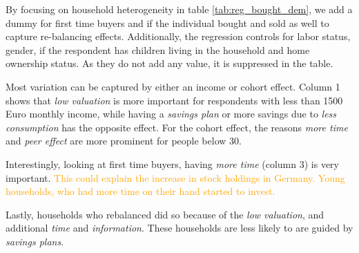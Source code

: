 \documentclass[ProjectABM]{subfiles}
\begin{document}
By focusing on household heterogeneity in table \ref{tab:reg_bought_dem}, we add a dummy for first time buyers and if the individual bought and sold as well to capture re-balancing effects. Additionally, the regression controls for labor status, gender, if the respondent has children living in the household and home ownership status. As they do not add any value, it is suppressed in the table.

Most variation can be captured by either an income or cohort effect. Column 1 shows that \textit{low valuation} is more important for respondents with less than 1500 Euro monthly income, while having a \textit{savings plan} or more savings due to \textit{less consumption} has the opposite effect. For the cohort effect, the reasons \textit{more time} and \textit{peer effect} are more prominent for people below 30.

Interestingly, looking at first time buyers, having \textit{more time} (column 3) is very important. \textcolor{orange}{This could explain the increase in stock holdings in Germany. Young households, who had more time on their hand started to invest.}

Lastly, households who rebalanced did so because of the \textit{low valuation}, and additional \textit{time} and \textit{information}. These households are less likely to are guided by \textit{savings plans}.


\end{document}
